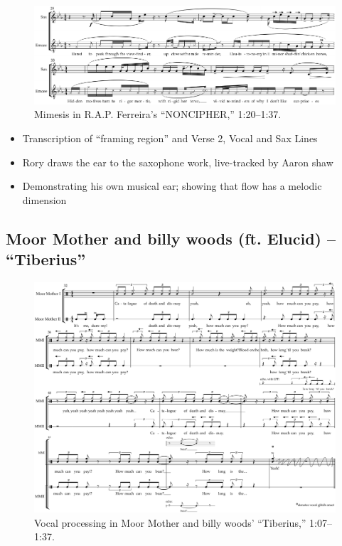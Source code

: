     \begin{figure}[!htp]
        \centering
        \includegraphics{images/figures/chp 03/120137nonciphermimesis.pdf}
        \caption{Mimesis in R.A.P. Ferreira's ``NONCIPHER,'' 1:20--1:37.}
        \label{fig:rorymimesis}
    \end{figure}
    \begin{itemize}
        \item Transcription of ``framing region'' and Verse 2, Vocal and Sax Lines
        \item Rory draws the ear to the saxophone work, live-tracked by Aaron shaw
        \item Demonstrating his own musical ear; showing that flow has a melodic dimension
    \end{itemize}
  
\subsection*{\centering Moor Mother and billy woods (ft. Elucid)  -- ``Tiberius''}

\begin{figure}[!p]
    \centering
    \includegraphics[width=\textwidth]{images/figures/chp 03/107136tiberiusprocessing.pdf}
    \caption{Vocal processing in Moor Mother and billy woods' ``Tiberius,'' 1:07--1:37.}
    \label{fig:moormotherprocess}
\end{figure}